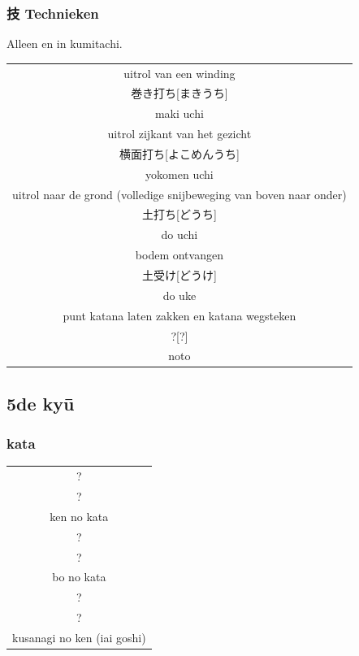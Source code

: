 \documentclass[12pt]{scrartcl}
\begin{document}
\begin{CJK*}{UTF8}{min}
\subsubsection{技 Technieken}
\noindent Alleen en in kumitachi.
\begin{table}[H]
\begin{center}
\begin{tabular}{c}
uitrol van een winding\\
巻き打ち[まきうち]\\
maki uchi\\
\hline
uitrol zijkant van het gezicht\\
横面打ち[よこめんうち]\\
yokomen uchi\\
\hline
uitrol naar de grond (volledige snijbeweging van boven naar onder)\\
土打ち[どうち]\\
do uchi\\
\hline
bodem ontvangen\\
土受け[どうけ]\\
do uke\\
\hline
punt katana laten zakken en katana wegsteken\\
?[?]\\
noto
\end{tabular}
\end{center}
\label{kyuu_6_katori_other}
\end{table}

\subsection{5de ky\={u}}
\subsubsection{kata}
\begin{table}[H]
\begin{center}
\begin{tabular}{c}
?\\
?\\
ken no kata\\
\hline
?\\
?\\
bo no kata\\
\hline
?\\
?\\
kusanagi no ken (iai goshi)
\end{tabular}
\end{center}
\label{kyuu_5_katori_kata}
\end{table}


\end{CJK*}
\end{document}
